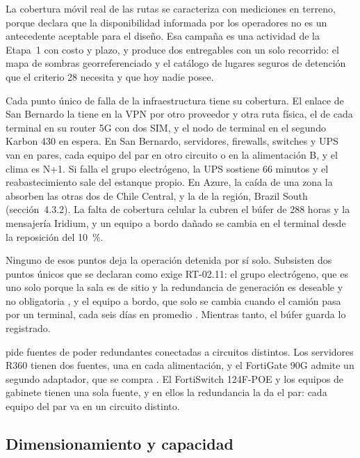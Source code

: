 La cobertura móvil real de las rutas se caracteriza con mediciones en terreno, porque
 declara que la disponibilidad informada por los operadores no es un antecedente
aceptable para el diseño. Esa campaña es una actividad de la Etapa~1 con costo y plazo, y produce dos
entregables con un solo recorrido: el mapa de sombras georreferenciado y el catálogo de lugares seguros
de detención que el criterio 28 necesita y que hoy nadie posee. 

Cada punto único de falla de la infraestructura tiene su cobertura. El enlace de San Bernardo la tiene
en la VPN por otro proveedor y otra ruta física, el de cada terminal en su router 5G con dos SIM, y el
nodo de terminal en el segundo Karbon 430 en espera. En San Bernardo, servidores, firewalls, switches y
UPS van en pares, cada equipo del par en otro circuito o en la alimentación B, y el clima es N+1. Si
falla el grupo electrógeno, la UPS sostiene 66 minutos y el reabastecimiento sale del estanque propio.
En Azure, la caída de una zona la absorben las otras dos de Chile Central, y la de la región, Brazil
South (sección~4.3.2). La falta de cobertura celular la cubren el búfer de 288 horas y la mensajería
Iridium, y un equipo a bordo dañado se cambia en el terminal desde la reposición del 10~\%.

Ninguno de esos puntos deja la operación detenida por sí solo. Subsisten dos puntos únicos que se
declaran como exige RT-02.11: el grupo electrógeno, que es uno solo porque la sala es de sitio y la
redundancia de generación es deseable y no obligatoria , y el equipo a bordo,
que solo se cambia cuando el camión pasa por un terminal, cada seis días en promedio
. Mientras tanto, el búfer guarda lo registrado.

 pide fuentes de poder redundantes conectadas a circuitos distintos. Los servidores
R360 tienen dos fuentes, una en cada alimentación, y el FortiGate 90G admite un segundo adaptador, que
se compra \parencite{fortinet_fg90g}. El FortiSwitch 124F-POE y los equipos de gabinete tienen una sola
fuente, y en ellos la redundancia la da el par: cada equipo del par va en un circuito distinto.

\subsection{Dimensionamiento y capacidad}\label{sec:4-dimensionamiento}

